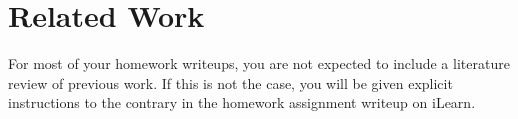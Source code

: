 
\section{Related Work}

For most of your homework writeups, you are not expected to include a literature review of previous work. If this is not the case, you will be given explicit instructions to the contrary in the homework assignment writeup on iLearn.

\begin{comment}

Sample citation to keep Latex happy~\cite{HennessyPatterson:CompArch5thEd:2011}.

Other efforts that exist to solve this problem and why are they less effective than our method
\begin{itemize}
    \item Resist the urge to point out only flaws in other work. Do your best to point out both the strengths and weaknesses to provide as well rounded a view of how your idea relates to other work as possible.
    \item In a social and political sense it is very smart as well as ethically superior to say good things, which are true, about other people’s work. A major motivation for this is that editors and program committee members have to get a set of reviews for your paper. The easiest way for them to decide who should review it is to look at the set of references to related work (e.g., [1,2, 3]) to find people who are likely to be competent to review your paper. The people whose work you talk about are thus likely to be reading what you say about their work while deciding what to say about your work.
    \item  Clear enough? Speak the truth, say what you have to say, but be generous to the efforts of others.
\end{itemize}

Other efforts that exist to solve related problems that are relevant, how are they relevant, and why are they less effective than our solution for this problem.

\begin{itemize}
    \item  Many times no one has solved your exact problem before, but others have solved closely related problems or problems with aspects that are strongly analogous to aspects of your problem.
\end{itemize}

\end{comment}


